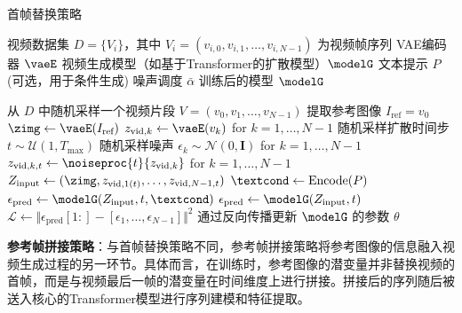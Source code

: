{\small
\begin{algorithm}[H]
    \setlength{\baselineskip}{0.9\baselineskip}
    \caption{首帧替换策略}
    \label{alg:first_frame_replacement}
    \begin{algorithmic}[1]
    \Require 
        \Statex 视频数据集 $D = \{V_i\}$，其中 $V_i = (v_{i,0}, v_{i,1}, \dots, v_{i,N-1})$ 为视频帧序列
        \Statex VAE编码器 $\vaeE$
        \Statex 视频生成模型（如基于Transformer的扩散模型）$\modelG$
        \Statex 文本提示 $P$ (可选，用于条件生成)
        \Statex 噪声调度 $\bar{\alpha}$
    \Ensure 训练后的模型 $\modelG$
    
        \State 从 $D$ 中随机采样一个视频片段 $V = (v_0, v_1, \dots, v_{N-1})$
        \State 提取参考图像 $I_{\text{ref}} = v_0$
        \State {}
        \State $\zimg \gets \vaeE(I_{\text{ref}})$
        \State {}
        \State $z_{\text{vid},k} \gets \vaeE(v_k)$ for $k=1, \dots, N-1$
        \State 随机采样扩散时间步 $t \sim \mathcal{U}(1, T_{\text{max}})$
        \State 随机采样噪声 $\epsilon_k \sim \mathcal{N}(0, \mathbf{I})$ for $k=1, \dots, N-1$
        \State {}
        \State  $z_{\text{vid},k,t}\gets \noiseproc{t}{z_{\text{vid},k}}$ for $k=1, \dots, N-1$
        \State {}
        \State $Z_{\text{input}} \gets (\zimg, z_{\text{vid},1(t)}, \dots, z_{\text{vid},N-1,t})$
            \State $\textcond \gets \text{Encode}(P)$ 
            \State $\epsilon_{\text{pred}} \gets \modelG(Z_{\text{input}}, t, \textcond)$
        \Else
            \State $\epsilon_{\text{pred}} \gets \modelG(Z_{\text{input}}, t)$
        \EndIf
        \State {}
        \State $\mathcal{L} \gets \Vert \epsilon_{\text{pred}}[1:] - [\epsilon_1, \dots, \epsilon_{N-1}] \Vert^2$ 
        \State 通过反向传播更新 $\modelG$ 的参数 $\theta$
    \EndFor
    \end{algorithmic}
\end{algorithm}
}

\textbf{参考帧拼接策略}：与首帧替换策略不同，参考帧拼接策略将参考图像的信息融入视频生成过程的另一环节。具体而言，在训练时，参考图像的潜变量并非替换视频的首帧，而是与视频最后一帧的潜变量在时间维度上进行拼接。拼接后的序列随后被送入核心的Transformer模型进行序列建模和特征提取。

